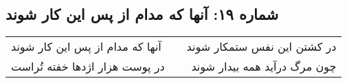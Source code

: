 \begin{center}
\section*{شماره ۱۹: آنها که مدام از پس این کار شوند}
\label{sec:019}
\begin{longtable}{l p{0.5cm} r}
آنها که مدام از پس این کار شوند
&&
در کشتن این نفس ستمکار شوند
\\
در پوست هزار اژدها خفته تُراست
&&
چون مرگ درآید همه بیدار شوند
\\
\end{longtable}
\end{center}
